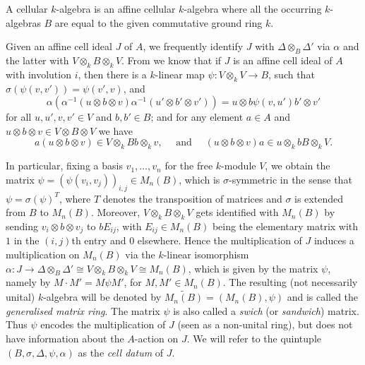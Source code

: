 \documentclass[oneside, a4paper, 11pt]{amsart}
\begin{document}
A cellular $k$-algebra is an affine cellular $k$-algebra where all the occurring $k$-algebras $B$ are equal to the given commutative ground ring $k$.
\medskip

Given an affine cell ideal $J$ of $A$, we frequently identify $J$ with $\Delta \otimes_B \Delta'$ via $\alpha$ and the latter with $V\otimes_k B \otimes_k V$. From \cite[Proposition 2.2]{KXaffine} we know that if $J$ is an affine cell ideal of $A$ with involution $i$, then there is a $k$-linear map $\psi : V\otimes_k V \to B$, such that $\sigma (\psi(v, v')) = \psi(v', v)$, and
    \begin{equation}
\alpha\left( \alpha^{-1}(u \otimes b \otimes v) \alpha^{-1}(u' \otimes b' \otimes v') \right) = u \otimes b\psi(v,u') b' \otimes v'        
    \end{equation}
for all $u, u' , v, v' \in V$ and  $b, b' \in B$; and for any element $a\in A$ and $u\otimes b \otimes v \in V\otimes B \otimes V$ we have
\begin{equation}
    a(u \otimes b \otimes v) \in  V \otimes_k  Bb  \otimes_k v, \quad \mbox{ and } \quad (u \otimes b \otimes v)a \in u \otimes_k bB \otimes_k V.
\end{equation}

In particular, fixing a basis $v_1, \ldots, v_n$ for the free $k$-module $V$, we obtain the matrix $\psi = \left( \psi(v_i,v_j)\right)_{i,j} \in M_n(B)$, which is $\sigma$-symmetric in the sense that $\psi = \sigma(\psi)^T$, where $T$ denotes the transposition of matrices and $\sigma$ is extended from $B$ to $M_n(B)$. 
Moreover, $V\otimes_k B\otimes_k V$ gets identified with $M_n(B)$ by sending $v_i\otimes b \otimes v_j$ to $bE_{ij}$, with $E_{ij} \in M_n(B)$ being the elementary matrix with $1$ in the $(i,j)$th entry and $0$ elsewhere. Hence the multiplication of $J$ induces a multiplication on $M_n(B)$ via the $k$-linear isomorphism $\alpha:J\to \Delta\otimes_B \Delta' \cong V\otimes_k B\otimes_k V \cong M_n(B)$, which is given by the matrix $\psi$, namely by
$M\cdot M' = M\psi M'$, for $M,M' \in M_n(B)$. The resulting (not necessarily unital) $k$-algebra will be denoted by $\widetilde{M_n(B)} = (M_n(B),\psi)$ and is called the \emph{generalised matrix ring}. The matrix $\psi$ is also called a \emph{swich} (or \emph{sandwich}) matrix. Thus $\psi$ encodes the multiplication of $J$ (seen as a non-unital ring), but does not have information about the $A$-action on $J$. We will refer to the quintuple $(B,\sigma, \Delta, \psi,\alpha)$ as the \emph{cell datum} of $J$.  
\end{document}

